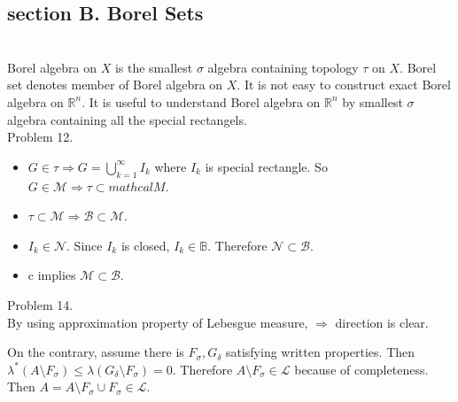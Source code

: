 \subsection*{section B. Borel Sets}\hfill \\

Borel algebra on $X$ is the smallest $\sigma$ algebra containing topology $\tau$ on $X$. Borel set denotes member of Borel algebra on $X$. It is not easy to construct exact Borel algebra on $\mathbb{R}^n$. It is useful to understand Borel algebra on $\mathbb{R}^{n}$ by smallest $\sigma$ algebra containing all the special rectangels. \\

Problem 12. \\

\begin{itemize}
    \item $G \in \tau \Rightarrow G = \bigcup_{k=1}^{\infty}I_k$ where $I_k$ is special rectangle. So $G \in \mathcal{M} \Rightarrow \tau \subset mathcal{M}$.
    \item $\tau \subset \mathcal{M} \Rightarrow \mathcal{B} \subset \mathcal{M}$.
    \item $I_k \in \mathcal{N}$. Since $I_k$ is closed, $I_k \in \mathbb{B}$. Therefore $\mathcal{N} \subset \mathcal{B}$.
    \item c implies $\mathcal{M} \subset \mathcal{B}$. \\
\end{itemize}

Problem 14. \\

By using approximation property of Lebesgue measure, $ \Rightarrow $ direction is clear.

On the contrary, assume there is $F_{\sigma}, G_{\delta}$ satisfying written properties.
Then $\lambda^{*}\left ( A \setminus F_{\sigma} \right ) \leq \lambda \left ( G_{\delta} \setminus F_{\sigma} \right ) = 0$.
Therefore $A \setminus F_{\sigma} \in \mathcal{L}$ because of completeness. Then $A = A\setminus F_{\sigma} \cup F_{\sigma} \in \mathcal{L}$. \\
